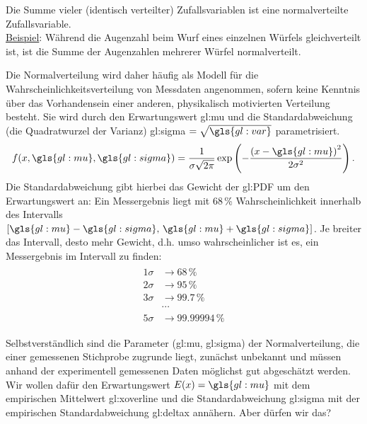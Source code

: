 \begin{center}
\begin{tcolorbox}[enhanced,width=6in,drop fuzzy shadow southwest,
    colframe=red!50!black,colback=red!05]
   Die Summe vieler (identisch verteilter)
Zufallsvariablen ist eine normalverteilte
Zufallsvariable. \\

\underline{Beispiel}: Während die Augenzahl beim Wurf eines einzelnen Würfels gleichverteilt ist, ist die Summe der Augenzahlen mehrerer Würfel normalverteilt.
\end{tcolorbox}
\end{center}

Die Normalverteilung wird daher häufig als Modell für die Wahrscheinlichkeitsverteilung von Messdaten angenommen, sofern keine Kenntnis über das Vorhandensein einer anderen, physikalisch motivierten Verteilung besteht. Sie wird durch den Erwartungswert \gls{gl:mu} und die Standardabweichung (die Quadratwurzel der Varianz) \gls{gl:sigma} $= \sqrt{ \gls{gl:var}}$ parametrisiert.
\begin{align}
f( x, \gls{gl:mu}, \gls{gl:sigma} ) = \frac{ 1 }{ \sigma \sqrt{ 2 \pi }} \exp{ \left( - \frac{ \left( x - \gls{gl:mu} \right)^2}{2 \sigma ^2} \right) }\,.
\label{eq:normalverteilung}
\end{align}
 Die Standardabweichung gibt hierbei das Gewicht der \gls{gl:PDF} um den Erwartungswert an: Ein Messergebnis liegt mit 68\,\% Wahrscheinlichkeit innerhalb des Intervalls $\left[ \gls{gl:mu} - \gls{gl:sigma} \text{, } \gls{gl:mu} + \gls{gl:sigma} \right]$. Je breiter das Intervall, desto mehr Gewicht, d.h. umso wahrscheinlicher ist es, ein Messergebnis im Intervall zu finden:
\begin{align}
\begin{split}
1\sigma & \rightarrow 68\,\% \\
2\sigma & \rightarrow 95\,\% \\ 
3\sigma & \rightarrow 99.7\,\% \\ 
& \cdots \\
5\sigma & \rightarrow 99.99994\,\%
\end{split}
\end{align}

Selbstverständlich sind die Parameter (\gls{gl:mu}, \gls{gl:sigma}) der Normalverteilung, die einer gemessenen Stichprobe zugrunde liegt, zunächst unbekannt und müssen anhand der experimentell gemessenen Daten möglichst gut abgeschätzt werden. Wir wollen dafür den Erwartungswert $E(x) =\gls{gl:mu}$ mit dem empirischen Mittelwert \gls{gl:xoverline}  und die Standardabweichung  \gls{gl:sigma} mit der empirischen Standardabweichung \gls{gl:deltax} annähern. Aber dürfen wir das?  \\ 

